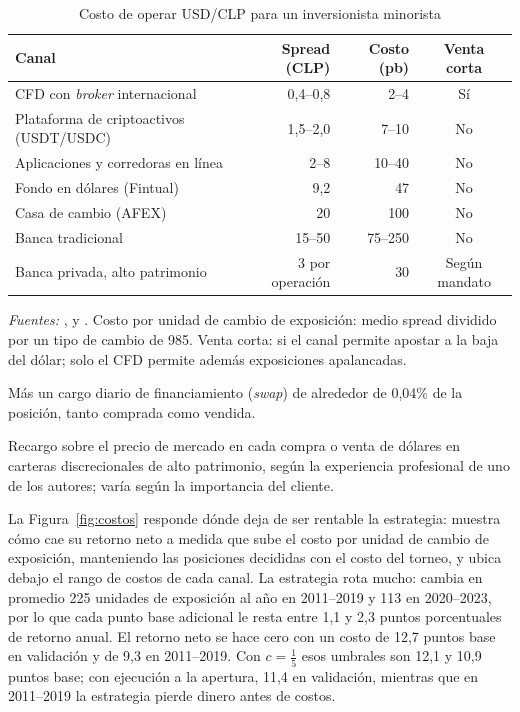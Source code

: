 \documentclass[11pt,a4paper]{article}
\begin{document}
\begin{table}[htbp]\centering\small
\caption{Costo de operar USD/CLP para un inversionista minorista}\label{tab:canales}
\begin{threeparttable}
\begin{tabular}{l r r c}
\toprule
Canal & Spread (CLP) & Costo (pb) & Venta corta \\
\midrule
CFD con \emph{broker} internacional & 0,4--0,8 & 2--4\tnote{a} & Sí \\
Plataforma de criptoactivos (USDT/USDC) & 1,5--2,0 & 7--10 & No \\
Aplicaciones y corredoras en línea & 2--8 & 10--40 & No \\
Fondo en dólares (Fintual) & 9,2 & 47 & No \\
Casa de cambio (AFEX) & 20 & 100 & No \\
Banca tradicional & 15--50 & 75--250 & No \\
Banca privada, alto patrimonio\tnote{b} & 3 por operación & 30 & Según mandato \\
\bottomrule
\end{tabular}
\begin{tablenotes}\footnotesize
\item \emph{Fuentes:} \citet{dolaronline2026}, \citet{admiral2026} y \citet{rankia2026}. Costo por unidad de cambio de exposición: medio spread dividido por un tipo de cambio de 985. Venta corta: si el canal permite apostar a la baja del dólar; solo el CFD permite además exposiciones apalancadas.
\item[a] Más un cargo diario de financiamiento (\emph{swap}) de alrededor de 0,04\% de la posición, tanto comprada como vendida.
\item[b] Recargo sobre el precio de mercado en cada compra o venta de dólares en carteras discrecionales de alto patrimonio, según la experiencia profesional de uno de los autores; varía según la importancia del cliente.
\end{tablenotes}
\end{threeparttable}
\end{table}

La Figura~\ref{fig:costos} responde dónde deja de ser rentable la estrategia: muestra cómo cae su retorno neto a medida que sube el costo por unidad de cambio de exposición, manteniendo las posiciones decididas con el costo del torneo, y ubica debajo el rango de costos de cada canal. La estrategia rota mucho: cambia en promedio 225 unidades de exposición al año en 2011--2019 y 113 en 2020--2023, por lo que cada punto base adicional le resta entre 1,1 y 2,3 puntos porcentuales de retorno anual. El retorno neto se hace cero con un costo de 12,7 puntos base en validación y de 9,3 en 2011--2019. Con \(c=\tfrac15\) esos umbrales son 12,1 y 10,9 puntos base; con ejecución a la apertura, 11,4 en validación, mientras que en 2011--2019 la estrategia pierde dinero antes de costos.
\end{document}
